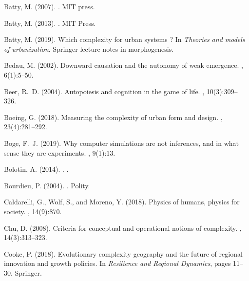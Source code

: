\begin{thebibliography}{}
Batty, M. (2007).
.
\newblock MIT press.

Batty, M. (2013).
.
\newblock MIT Press.

Batty, M. (2019).
\newblock Which complexity for urban systems ?
\newblock In {\em Theories and models of urbanization}. Springer lecture notes
  in morphogenesis.

Bedau, M. (2002).
\newblock Downward causation and the autonomy of weak emergence.
,
  6(1):5--50.

Beer, R.~D. (2004).
\newblock Autopoiesis and cognition in the game of life.
, 10(3):309--326.

Boeing, G. (2018).
\newblock Measuring the complexity of urban form and design.
, 23(4):281--292.

Boge, F.~J. (2019).
\newblock Why computer simulations are not inferences, and in what sense they
  are experiments.
, 9(1):13.

{Bolotin}, A. (2014).
.
.

Bourdieu, P. (2004).
.
\newblock Polity.

Caldarelli, G., Wolf, S., and Moreno, Y. (2018).
\newblock Physics of humans, physics for society.
, 14(9):870.

Chu, D. (2008).
\newblock Criteria for conceptual and operational notions of complexity.
, 14(3):313--323.

Cooke, P. (2018).
\newblock Evolutionary complexity geography and the future of regional
  innovation and growth policies.
\newblock In {\em Resilience and Regional Dynamics}, pages 11--30. Springer.


\end{thebibliography}
